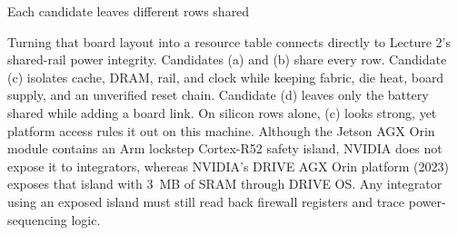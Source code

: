 \documentclass[aspectratio=169, 12pt]{beamer}
\begin{document}
\begin{frame}{Each candidate leaves different rows shared}
{  Turning that board layout into a resource table connects directly to Lecture 2's shared-rail power integrity. Candidates (a) and (b) share every row. Candidate (c) isolates cache, DRAM, rail, and clock while keeping fabric, die heat, board supply, and an unverified reset chain. Candidate (d) leaves only the battery shared while adding a board link. On silicon rows alone, (c) looks strong, yet platform access rules it out on this machine. Although the Jetson AGX Orin module contains an Arm lockstep Cortex-R52 safety island, NVIDIA does not expose it to integrators, whereas NVIDIA's DRIVE AGX Orin platform (2023) exposes that island with 3~MB of SRAM through DRIVE OS. Any integrator using an exposed island must still read back firewall registers and trace power-sequencing logic.


}
\end{frame}
\end{document}
